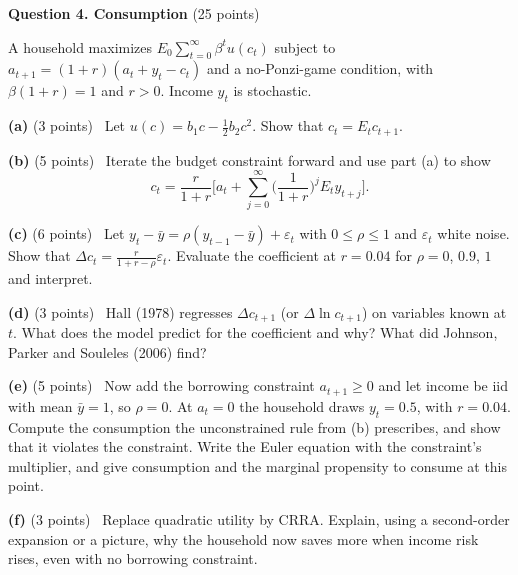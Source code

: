 \documentclass[12pt]{article}
\newcommand{\E}{E}
\newcommand{\gap}[1]{\par\vspace{#1}}
\newcommand{\qp}[2]{\par\medskip\textbf{(#1)} (#2 points)\ }
\begin{document}
\gap{4.5cm}
\newpage
\textbf{Question 4. Consumption} (25 points)

A household maximizes $\E_0\sum_{t=0}^\infty\beta^tu(c_t)$ subject to
$a_{t+1}=(1+r)(a_t+y_t-c_t)$ and a no-Ponzi-game condition, with
$\beta(1+r)=1$ and $r>0$. Income $y_t$ is stochastic.

\needspace{7.0cm}
\qp{a}{3} Let $u(c)=b_1c-\frac12b_2c^2$. Show that $c_t=\E_tc_{t+1}$.
\gap{4.5cm}
\needspace{10.0cm}
\qp{b}{5} Iterate the budget constraint forward and use part (a) to show
\[
c_t=\frac{r}{1+r}\Big[a_t+\sum_{j=0}^\infty\Big(\frac{1}{1+r}\Big)^j\E_ty_{t+j}\Big].
\]
\gap{7.5cm}
\needspace{11.5cm}
\qp{c}{6} Let $y_t-\bar y=\rho(y_{t-1}-\bar y)+\varepsilon_t$ with
$0\le\rho\le1$ and $\varepsilon_t$ white noise. Show that
$\Delta c_t=\frac{r}{1+r-\rho}\varepsilon_t$. Evaluate the coefficient at
$r=0.04$ for $\rho=0$, $0.9$, $1$ and interpret.
\gap{9.0cm}
\needspace{7.0cm}
\qp{d}{3} Hall (1978) regresses $\Delta c_{t+1}$ (or $\Delta\ln c_{t+1}$)
on variables known at $t$. What does the model predict for the coefficient
and why? What did Johnson, Parker and Souleles (2006) find?
\gap{4.5cm}
\needspace{10.0cm}
\qp{e}{5} Now add the borrowing constraint $a_{t+1}\ge0$ and let income be
iid with mean $\bar y=1$, so $\rho=0$. At $a_t=0$ the household draws
$y_t=0.5$, with $r=0.04$. Compute the consumption the unconstrained rule
from (b) prescribes, and show that it violates the constraint. Write the
Euler equation with the constraint's multiplier, and give consumption and
the marginal propensity to consume at this point.
\gap{7.5cm}
\needspace{7.0cm}
\qp{f}{3} Replace quadratic utility by CRRA. Explain, using a
second-order expansion or a picture, why the household now saves more
when income risk rises, even with no borrowing constraint.


\gap{4.5cm}
\end{document}
